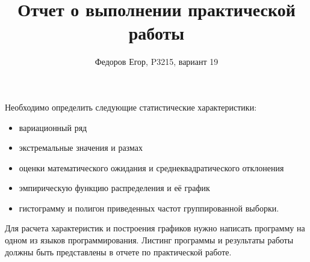 \documentclass{article}
\title{Отчет о выполнении практической работы \textnumero 5}
\author{Федоров Егор, P3215, вариант 19}
\date{}
\begin{document}
  \maketitle

  Необходимо определить следующие статистические
  характеристики:
  \begin{itemize}
    \item вариационный ряд
    \item экстремальные значения и размах
    \item оценки математического ожидания и среднеквадратического отклонения
    \item эмпирическую функцию распределения и её график
    \item гистограмму и полигон приведенных частот группированной выборки.
  \end{itemize}

  Для расчета
  характеристик и построения графиков нужно написать программу на одном из языков
  программирования. Листинг программы и результаты работы должны быть представлены в отчете
  по практической работе.
\end{document}
